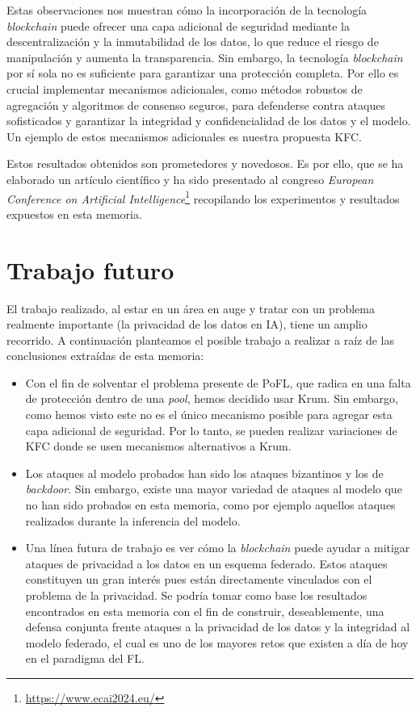 Estas observaciones nos muestran cómo la incorporación de la tecnología \textit{blockchain} puede ofrecer una capa adicional de seguridad mediante la descentralización y la inmutabilidad de los datos, lo que reduce el riesgo de manipulación y aumenta la transparencia. Sin embargo, la tecnología \textit{blockchain} por sí sola no es suficiente para garantizar una protección completa. Por ello es crucial implementar mecanismos adicionales, como métodos robustos de agregación y algoritmos de consenso seguros, para defenderse contra ataques sofisticados y garantizar la integridad y confidencialidad de los datos y el modelo. Un ejemplo de estos mecanismos adicionales es nuestra propuesta \ac{KFC}.

Estos resultados obtenidos son prometedores y novedosos. Es por ello, que se ha elaborado un artículo científico y ha sido presentado al congreso \textit{European Conference on Artificial Intelligence}\footnote{\url{https://www.ecai2024.eu/}} recopilando los experimentos y resultados expuestos en esta memoria. %


\chapter{Trabajo futuro}

El trabajo realizado, al estar en un área en auge y tratar con un problema realmente importante (la privacidad de los datos en \ac{IA}), tiene un amplio recorrido. A continuación planteamos el posible trabajo a realizar a raíz de las conclusiones extraídas de esta memoria:

\begin{itemize}
    \item Con el fin de solventar el problema presente de \ac{PoFL}, que radica en una falta de protección dentro de una \textit{pool}, hemos decidido usar Krum. Sin embargo, como hemos visto este no es el único mecanismo posible para agregar esta capa adicional de seguridad. Por lo tanto, se pueden realizar variaciones de \ac{KFC} donde se usen mecanismos alternativos a Krum.
    \item Los ataques al modelo probados han sido los ataques bizantinos y los de \textit{backdoor}. Sin embargo, existe una mayor variedad de ataques al modelo que no han sido probados en esta memoria, como por ejemplo aquellos ataques realizados durante la inferencia del modelo.
    \item Una línea futura de trabajo es ver cómo la \textit{blockchain} puede ayudar a mitigar ataques de privacidad a los datos en un esquema federado. Estos ataques constituyen un gran interés pues están directamente vinculados con el problema de la privacidad. Se podría tomar como base los resultados encontrados en esta memoria con el fin de construir, deseablemente, una defensa conjunta frente ataques a la privacidad de los datos y la integridad al modelo federado, el cual es uno de los mayores retos que existen a día de hoy en el paradigma del \ac{FL}.
\end{itemize}

